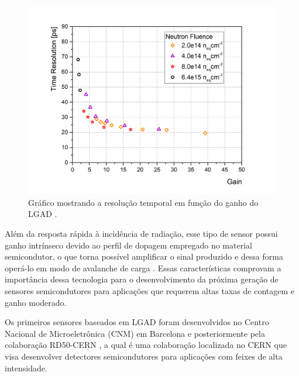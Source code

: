 \begin{figure} 
    \centering
    \includegraphics[width=12.0cm]{assets/timeresolution_vs_gain.png}
    \caption{ Gráfico mostrando a resolução temporal em função do ganho do LGAD \cite{tdr}.}
    \label{timeresolution}
\end{figure}


Além da resposta rápida à incidência de radiação, esse tipo de sensor possui ganho intrínseco devido ao perfil de dopagem empregado no material semicondutor, o que torna possível amplificar o sinal produzido e dessa forma operá-lo em modo de avalanche de carga \cite{JIN_LGAD,NIMA_LGAD,NIMA_LGAD_I,NIMA_LGAD_II,NIMA_LGAD_III}. Essas características comprovam a importância dessa tecnologia para o desenvolvimento da próxima geração de sensores semicondutores para aplicações que requerem altas taxas de contagem e ganho moderado.

Os primeiros sensores baseados em LGAD foram desenvolvidos no Centro Nacional de Microeletrônica (CNM) em Barcelona e posteriormente pela colaboração RD50-CERN \cite{tdr}, a qual é uma colaboração localizada no CERN que visa desenvolver detectores semicondutores para aplicações com feixes de alta intensidade.%

